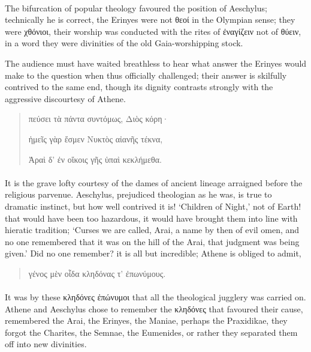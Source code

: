 \documentclass[a4paper, 11pt, oneside, polutonikogreek, english]{article}
\begin{document}
\paragraph{}
The bifurcation of popular theology favoured the position of Aeschylus; technically he is correct, the Erinyes were not θεοί in the Olympian sense; they were χθόνιοι, their worship was conducted with the rites of ἐναγίζειν not of θύειν, in a word they were divinities of the old Gaia-worshipping stock.

The audience must have waited breathless to hear what answer the Erinyes would make to the question when thus officially challenged; their answer is skilfully contrived to the same end, though its dignity contrasts strongly with the aggressive discourtesy of Athene.
\begin{quotation}
\large
πεύσει τὰ πάντα συντόμως, Διὸς κόρη·

ἡμεῖς γὰρ ἔσμεν Νυκτὸς αἰανῆς τέκνα,

Ἀραὶ δ' ἐν οἴκοις γῆς ὑπαὶ κεκλήμεθα.
\end{quotation}
\paragraph{}
It is the grave lofty courtesy of the dames of ancient lineage arraigned before the religious parvenue. Aeschylus, prejudiced theologian as he was, is true to dramatic instinct, but how well contrived it is! `Children of Night,' not of Earth! that would have been too hazardous, it would have brought them into line with hieratic tradition; `Curses we are called, Arai, a name by then of evil omen, and no one remembered that it was on the hill of the Arai, that judgment was being given.' Did no one remember? it is all but incredible; Athene is obliged to admit,
\begin{quotation}
\large
γένος μὲν οἷδα κληδόνας τ' ἐπωνύμους.
\end{quotation}
\paragraph{}
It was by these κληδόνες ἐπώνυμοι that all the theological jugglery was carried on. Athene and Aeschylus chose to remember the κληδόνες that favoured their cause, remembered the Arai, the Erinyes, the Maniae, perhaps the Praxidikae, they forgot the Charites, the Semnae, the Eumenides, or rather they separated them off into new divinities.
\end{document}
